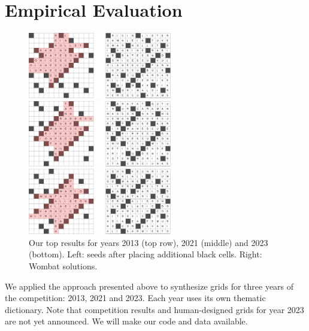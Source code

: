 \section{Empirical Evaluation}


\begin{figure}[th]
\centering
\includegraphics[width=0.56\textwidth]{_empiricalSupport/_originalSubmission/y-2013/results/_runWombat/mrmeGrids_y2013-60x932-14400x352-14113466-paper.pdf}

\vspace{0.15cm}

\includegraphics[width=0.56\textwidth]{_empiricalSupport/_originalSubmission/y-2021/results/_runWombat/mrmeGrids_feb3-60x38035-14400x224-13741779-paper.pdf}

\vspace{0.15cm}

\includegraphics[width=0.56\textwidth]{_empiricalSupport/_originalSubmission/y-2023/results/_runWombat/mrmeGrids_y2023-60x446-14400x352-14179462-paper.pdf}

\caption{Our top results for years 2013 (top row), 2021 (middle) and 2023 (bottom). Left: seeds after
placing additional black cells. Right: {\sc Wombat} solutions.}
\label{fig:results}
\end{figure}

We applied the approach presented above to synthesize grids for three years of the competition: 2013, 2021 and 2023. Each year uses its own thematic dictionary. Note that competition results and human-designed grids for year 2023 are not yet announced.
We will make our code and data available.



